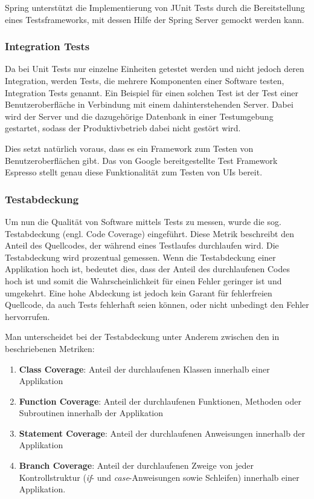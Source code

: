				Spring unterstützt die Implementierung von JUnit Tests durch die Bereitstellung eines Testsframeworks, mit dessen Hilfe der Spring Server gemockt werden kann. 
				
			\subsubsection{Integration Tests}
			\label{qm.integration_tests}
			
				Da bei Unit Tests nur einzelne Einheiten getestet werden und nicht jedoch deren Integration, werden Tests, die mehrere Komponenten einer Software testen, Integration Tests genannt. Ein Beispiel für einen solchen Test ist der Test einer Benutzeroberfläche in Verbindung mit einem dahinterstehenden Server. Dabei wird der Server und die dazugehörige Datenbank in einer Testumgebung gestartet, sodass der Produktivbetrieb dabei nicht gestört wird. 
				
				Dies setzt natürlich voraus, dass es ein Framework zum Testen von Benutzeroberflächen gibt. Das von Google bereitgestellte Test Framework Espresso stellt genau diese Funktionalität zum Testen von \acs{UI}s bereit. 
			
			\subsubsection{Testabdeckung}
			\label{qm.tests.testabdeckung}
			
				Um nun die Qualität von Software mittels Tests zu messen, wurde die sog. Testabdeckung (engl. Code Coverage) eingeführt. Diese Metrik beschreibt den Anteil des Quellcodes, der während eines Testlaufes durchlaufen wird. Die Testabdeckung wird prozentual gemessen. Wenn die Testabdeckung einer Applikation hoch ist, bedeutet dies, dass der Anteil des durchlaufenen Codes hoch ist und somit die Wahrscheinlichkeit für einen Fehler geringer ist und umgekehrt. Eine hohe Abdeckung ist jedoch kein Garant für fehlerfreien Quellcode, da auch Tests fehlerhaft seien können, oder nicht unbedingt den Fehler hervorrufen. \cite{Fowler.2292020b}
				
				Man unterscheidet bei der Testabdeckung unter Anderem zwischen den in \cite{Myers.2004} beschriebenen Metriken:
				
				\begin{enumerate}
					\item 
						\textbf{Class Coverage}: Anteil der durchlaufenen Klassen innerhalb einer Applikation
					\item 	
						\textbf{Function Coverage}: Anteil der durchlaufenen Funktionen, Methoden oder Subroutinen innerhalb der Applikation
					\item 
						\textbf{Statement Coverage}: Anteil der durchlaufenen Anweisungen innerhalb der Applikation
					\item 
						\textbf{Branch Coverage}: Anteil der durchlaufenen Zweige von jeder Kontrollstruktur (\textit{if}- und \textit{case}-Anweisungen sowie Schleifen) innerhalb einer Applikation. 
				\end{enumerate}
			
